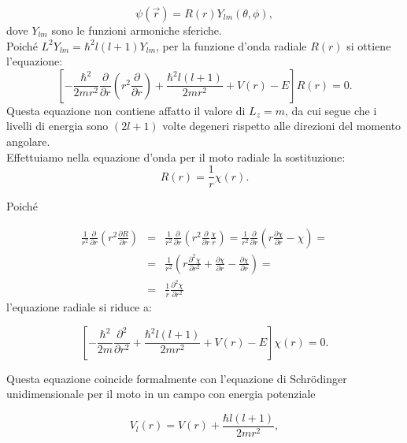 \begin{equation}
\psi\left(\vec{r}\right)=R\left(r\right)Y_{lm}\left(\theta,\phi\right) ,
\end{equation}
dove $Y_{lm}$ sono le funzioni armoniche sferiche.\\
Poiché $L^2Y_{lm}=\hbar^2l\left(l+1\right)Y_{lm}$, per la funzione d'onda radiale $R\left(r\right)$ si ottiene l'equazione:
\begin{equation}
\left[-\frac{\hbar^2}{2mr^2}\frac{\partial}{\partial r}\left(r^2\frac{\partial}{\partial r}\right)+\frac{\hbar^2l\left(l+1\right)}{2mr^2}+V\left(r\right)-E\right]R\left(r\right)=0 .
\end{equation}
Questa equazione non contiene affatto il valore di $L_z=m$, da cui segue che i livelli di energia sono $\left(2l+1\right)$ volte degeneri rispetto alle direzioni del momento angolare.\\
Effettuiamo nella equazione d'onda per il moto radiale la sostituzione:
\begin{equation}
R\left(r\right)=\frac{1}{r}\chi\left(r\right) .
\end{equation}

Poiché

\begin{eqnarray}
\frac{1}{r^2}\frac{\partial}{\partial r}\left(r^2\frac{\partial R}{\partial r}\right)&=&\frac{1}{r^2}\frac{\partial}{\partial r}\left(r^2\frac{\partial}{\partial r}\frac{\chi}{r}\right)=\frac{1}{r^2}\frac{\partial}{\partial r}\left(r \frac{\partial\chi}{\partial r}-\chi\right)= \nonumber \\
&=& \frac{1}{r^2}\left(r\frac{\partial^2\chi}{\partial r^2}+\frac{\partial\chi}{\partial r}-\frac{\partial\chi}{\partial r}\right)= \nonumber \\
&= & \frac{1}{r}\frac{\partial^2 \chi}{\partial r^2}
\end{eqnarray}
l'equazione radiale si riduce a:

\begin{equation}
\left[-\frac{\hbar^2}{2m}\frac{\partial^2}{\partial r^2}+\frac{\hbar^2l\left(l+1\right)}{2mr^2}+V\left(r\right)-E\right]\chi\left(r\right)=0 .
\end{equation}

Questa equazione coincide formalmente con l'equazione di Schr\"{o}dinger unidimensionale per il moto in un campo con energia potenziale

\begin{equation}
V_l\left(r\right)=V\left(r\right)+\frac{\hbar l\left(l+1\right)}{2mr^2} ,
\end{equation}

